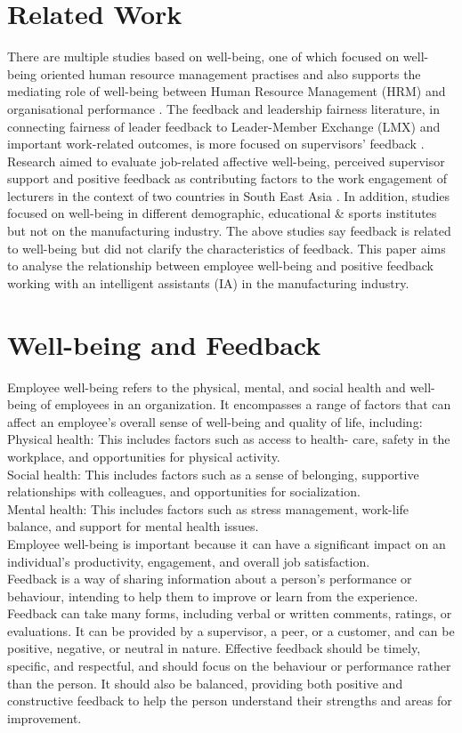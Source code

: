 \documentclass[conference]{IEEEtran}
\begin{document}
\section{Related Work}
	There are multiple studies based on well-being, one of which focused on well-being oriented human resource management practises and also supports the mediating role of well-being between Human Resource Management (HRM) and organisational performance \cite{b19}. The feedback and leadership fairness literature, in connecting fairness of leader feedback to Leader-Member Exchange (LMX) and important work-related outcomes, is more focused on supervisors' feedback \cite{b20}. Research aimed to evaluate job-related affective well-being, perceived supervisor support and positive feedback as contributing factors to the work engagement of lecturers in the context of two countries in South East Asia \cite{b21}. In addition, studies focused on well-being in different demographic, educational \& sports institutes but not on the manufacturing industry. The above studies say feedback is related to well-being but did not clarify the characteristics 
	of feedback. This paper aims to analyse the relationship between employee well-being and positive feedback working with an intelligent assistants (IA) in the manufacturing industry. 
	
\section{Well-being and Feedback}

	Employee well-being refers to the physical, mental, and social health and well-being of employees in an organization\cite{b22}. It encompasses a range of factors that can affect an employee’s overall sense of well-being and quality of life, including:\\
	Physical health: This includes factors such as access to health- care, safety in the workplace, and opportunities for physical activity.\cite{b24}\\
	Social health: This includes factors such as a sense of belonging, supportive relationships with colleagues, and opportunities for socialization.\cite{b24}\\
	Mental health: This includes factors such as stress management, work-life balance, and support for mental health issues.\cite{b25}\\
	Employee well-being is important because it can have a significant impact on an individual’s productivity, engagement, and overall job satisfaction.\\
	Feedback is a way of sharing information about a person’s performance or behaviour, intending to help them to improve or learn from the experience. Feedback can take many forms, including verbal or written comments, ratings, or evaluations. It can be provided by a supervisor, a peer, or a customer, and can be positive, negative, or neutral in nature. Effective feedback should be timely, specific, and respectful, and should focus on the behaviour or performance rather than the person\cite{b23}. It should also be balanced, providing both positive and constructive feedback to help the person understand their strengths and areas for improvement. 
\end{document}
